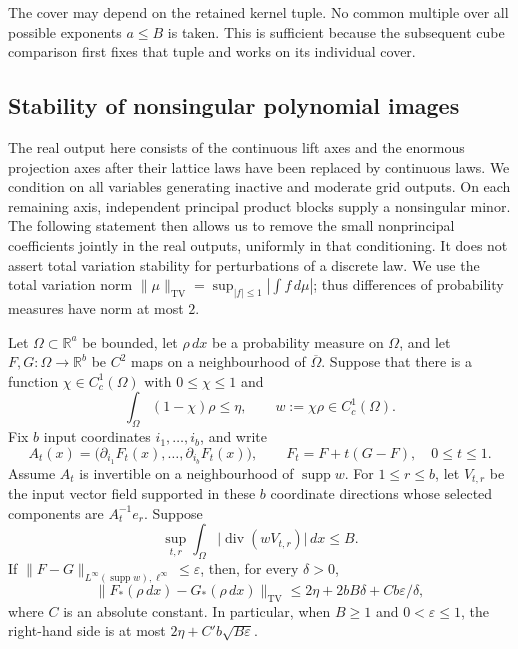 The cover may depend on the retained kernel tuple. No common
multiple over all possible exponents $a\le B$ is taken.
This is sufficient because the subsequent cube comparison
first fixes that tuple and works on its individual cover.

\subsection{Stability of nonsingular polynomial images}

The real output here consists of the continuous lift axes and the
enormous projection axes after their lattice laws have been replaced
by continuous laws. We condition on all variables generating inactive
and moderate grid outputs. On each remaining axis, independent
principal product blocks supply a nonsingular minor. The following
statement then allows us to remove the small nonprincipal coefficients
jointly in the real outputs, uniformly in that conditioning. It does
not assert total variation stability for perturbations of a discrete
law. We use the total variation
norm $\|\mu\|_{\mathrm{TV}}=\sup_{|f|\leq 1}|\int f\,d\mu|$; thus differences
of probability measures have norm at most $2$.

\begin{lemma}\label{cube:image-perturbation}
Let $\Omega\subset\mathbb R^a$ be bounded, let $\rho\,dx$ be a probability
measure on $\Omega$, and let $F,G:\Omega\to\mathbb R^b$ be $C^2$ maps on a
neighbourhood of $\overline\Omega$. Suppose that there is a function
$\chi\in C_c^1(\Omega)$ with $0\leq\chi\leq1$ and
\[
 \int_\Omega(1-\chi)\rho\leq\eta,
 \qquad w:=\chi\rho\in C_c^1(\Omega).
\]
Fix $b$ input coordinates $i_1,\ldots,i_b$, and write
\[
 A_t(x)=\big(\partial_{i_1}F_t(x),\ldots,
                  \partial_{i_b}F_t(x)\big),\qquad
 F_t=F+t(G-F),\quad 0\leq t\leq1.
\]
Assume $A_t$ is invertible on a neighbourhood of $\operatorname{supp}w$.
For $1\leq r\leq b$, let $V_{t,r}$ be the input vector field supported in
these $b$ coordinate directions whose selected components are
$A_t^{-1}e_r$. Suppose
\[
 \sup_{t,r}\int_\Omega
       \big|\operatorname{div}(wV_{t,r})\big|\,dx\leq B.
\]
If $\|F-G\|_{L^\infty(\operatorname{supp}w),\ell^\infty}\leq\varepsilon$,
then, for every $\delta>0$,
\[
 \|F_*(\rho\,dx)-G_*(\rho\,dx)\|_{\mathrm{TV}}
 \leq 2\eta+2bB\delta+C b\varepsilon/\delta,
\]
where $C$ is an absolute constant. In particular, when $B\geq1$ and
$0<\varepsilon\leq1$, the right-hand side is at most
$2\eta+C' b\sqrt{B\varepsilon}$.
\end{lemma}

